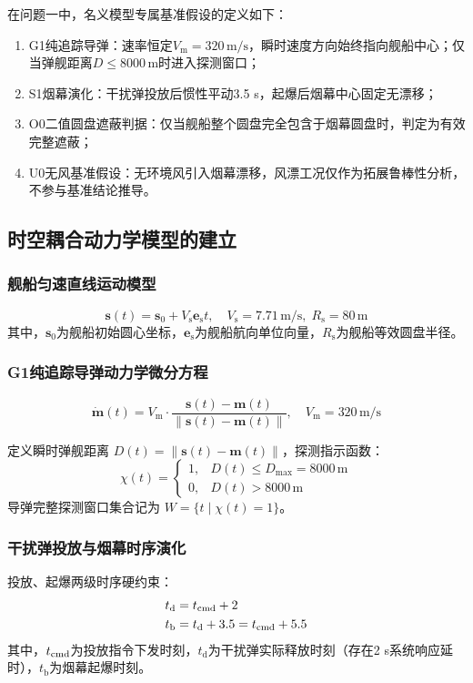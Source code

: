 \documentclass[withoutpreface,bwprint]{cumcmthesis}
\begin{document}
在问题一中，名义模型专属基准假设的定义如下：
\begin{enumerate}
	
	\item G1纯追踪导弹：速率恒定$V_{\mathrm{m}}=320\,\text{m/s}$，瞬时速度方向始终指向舰船中心；仅当弹舰距离$D\leq 8000\,\text{m}$时进入探测窗口；
	\item S1烟幕演化：干扰弹投放后惯性平动3.5 s，起爆后烟幕中心固定无漂移；
	\item O0二值圆盘遮蔽判据：仅当舰船整个圆盘完全包含于烟幕圆盘时，判定为有效完整遮蔽；
	\item U0无风基准假设：无环境风引入烟幕漂移，风漂工况仅作为拓展鲁棒性分析，不参与基准结论推导。
\end{enumerate}

\subsection{时空耦合动力学模型的建立}

\subsubsection{舰船匀速直线运动模型}
\begin{equation}
	\bm{s}(t) = \bm{s}_0 + V_{\mathrm{s}} \bm{e}_{\mathrm{s}} t,\quad V_{\mathrm{s}}=7.71\,\text{m/s},\;R_{\mathrm{s}}=80\,\text{m}
	\label{eq:ship}
\end{equation}
其中，$\bm{s}_0$为舰船初始圆心坐标，$\bm{e}_{\mathrm{s}}$为舰船航向单位向量，$R_{\mathrm{s}}$为舰船等效圆盘半径。

\subsubsection{G1纯追踪导弹动力学微分方程}
\begin{equation}
	\dot{\bm{m}}(t) = V_{\mathrm{m}} \cdot \frac{\bm{s}(t)-\bm{m}(t)}{\|\bm{s}(t)-\bm{m}(t)\|},\quad V_{\mathrm{m}}=320\,\text{m/s}
	\label{eq:missile}
\end{equation}

定义瞬时弹舰距离 $D(t)=\|\bm{s}(t)-\bm{m}(t)\|$，探测指示函数：
\[
\chi(t)=
\begin{cases}
	1, & D(t)\leq D_{\max}=8000\,\text{m} \\
	0, & D(t)>8000\,\text{m}
\end{cases}
\]
导弹完整探测窗口集合记为 $W=\{t\mid \chi(t)=1\}$。

\subsubsection{干扰弹投放与烟幕时序演化}
投放、起爆两级时序硬约束：
\begin{align}
	t_{\mathrm{d}} &= t_{\rm cmd}+2 \label{eq:drop} \\
	t_{\mathrm{b}} &= t_{\mathrm{d}}+3.5 = t_{\rm cmd}+5.5 \label{eq:burst}
\end{align}
其中，$t_{\rm cmd}$为投放指令下发时刻，$t_{\mathrm{d}}$为干扰弹实际释放时刻（存在2 s系统响应延时），$t_{\mathrm{b}}$为烟幕起爆时刻。
\end{document}
